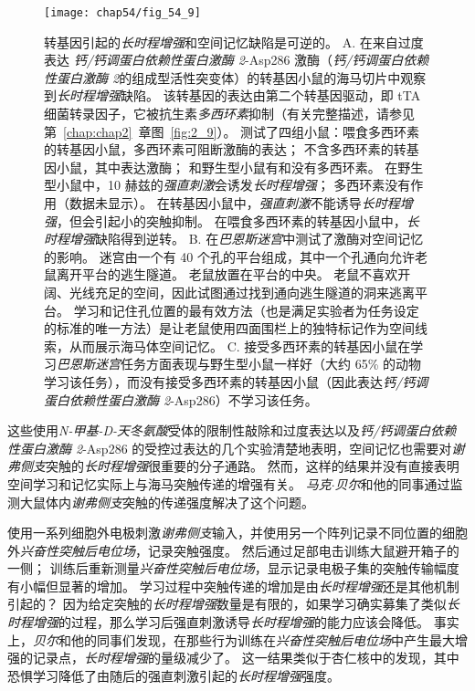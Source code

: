 \begin{figure}[htbp]
	\centering
	\texttt{[image: chap54/fig\_54\_9]}
	\caption{转基因引起的\textit{长时程增强}和空间记忆缺陷是可逆的。
		A. 在来自过度表达 \textit{钙/钙调蛋白依赖性蛋白激酶 2}-Asp286 激酶（\textit{钙/钙调蛋白依赖性蛋白激酶 2}的组成型活性突变体）的转基因小鼠的海马切片中观察到\textit{长时程增强}缺陷。
		该转基因的表达由第二个转基因驱动，即 tTA 细菌转录因子，它被抗生素\textit{多西环素}抑制（有关完整描述，请参见第~\ref{chap:chap2}~章图~\ref{fig:2_9}）。
		测试了四组小鼠：喂食多西环素的转基因小鼠，多西环素可阻断激酶的表达；
		不含多西环素的转基因小鼠，其中表达激酶；
		和野生型小鼠有和没有多西环素。
		在野生型小鼠中，10 赫兹的\textit{强直刺激}会诱发\textit{长时程增强}；
		多西环素没有作用（数据未显示）。
		在转基因小鼠中，\textit{强直刺激}不能诱导\textit{长时程增强}，但会引起小的突触抑制。
		在喂食多西环素的转基因小鼠中，\textit{长时程增强}缺陷得到逆转。
		B. 在\textit{巴恩斯迷宫}中测试了激酶对空间记忆的影响。
		迷宫由一个有 40 个孔的平台组成，其中一个孔通向允许老鼠离开平台的逃生隧道。
		老鼠放置在平台的中央。
		老鼠不喜欢开阔、光线充足的空间，因此试图通过找到通向逃生隧道的洞来逃离平台。
		学习和记住孔位置的最有效方法（也是满足实验者为任务设定的标准的唯一方法）是让老鼠使用四面围栏上的独特标记作为空间线索，从而展示海马体空间记忆。
		C. 接受多西环素的转基因小鼠在学习\textit{巴恩斯迷宫}任务方面表现与野生型小鼠一样好（大约 65\% 的动物学习该任务），而没有接受多西环素的转基因小鼠（因此表达\textit{钙/钙调蛋白依赖性蛋白激酶 2}-Asp286）不学习该任务。}
	\label{fig:54_9}
\end{figure}


这些使用\textit{N-甲基-D-天冬氨酸}受体的限制性敲除和过度表达以及\textit{钙/钙调蛋白依赖性蛋白激酶 2}-Asp286 的受控过表达的几个实验清楚地表明，空间记忆也需要对\textit{谢弗侧支}突触的\textit{长时程增强}很重要的分子通路。
然而，这样的结果并没有直接表明空间学习和记忆实际上与海马突触传递的增强有关。
\textit{马克$\cdot$贝尔}和他的同事通过监测大鼠体内\textit{谢弗侧支}突触的传递强度解决了这个问题。


使用一系列细胞外电极刺激\textit{谢弗侧支}输入，并使用另一个阵列记录不同位置的细胞外\textit{兴奋性突触后电位场}，记录突触强度。
然后通过足部电击训练大鼠避开箱子的一侧；
训练后重新测量\textit{兴奋性突触后电位场}，显示记录电极子集的突触传输幅度有小幅但显著的增加。
学习过程中突触传递的增加是由\textit{长时程增强}还是其他机制引起的？
因为给定突触的\textit{长时程增强}数量是有限的，如果学习确实募集了类似\textit{长时程增强}的过程，那么学习后强直刺激诱导\textit{长时程增强}的能力应该会降低。
事实上，\textit{贝尔}和他的同事们发现，在那些行为训练在\textit{兴奋性突触后电位场}中产生最大增强的记录点，\textit{长时程增强}的量级减少了。
这一结果类似于杏仁核中的发现，其中恐惧学习降低了由随后的强直刺激引起的\textit{长时程增强}强度。


